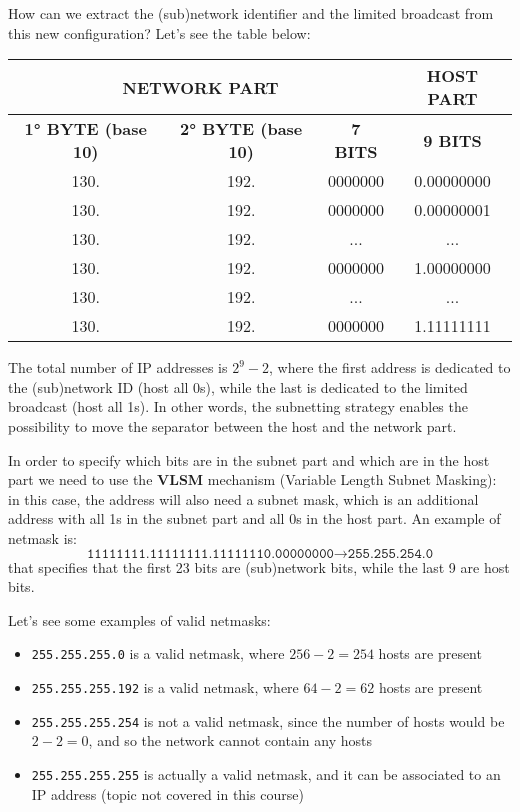 How can we extract the (sub)network identifier and the limited broadcast from this new configuration? Let's see the table below:
\begin{table}[!h]
    \centering
    \begin{tabular}{|ccc|c|}
    \hline
    \multicolumn{3}{|c|}{\textbf{NETWORK PART}} & \textbf{HOST PART} \\ \hline
    \multicolumn{1}{|c|}{\textbf{1° BYTE (base 10)}} & \multicolumn{1}{c|}{\textbf{2° BYTE (base 10)}} & \textbf{7 BITS} & \textbf{9 BITS} \\ \hline
    \multicolumn{1}{|c|}{130.} & \multicolumn{1}{c|}{192.} & 0000000 & 0.00000000 \\ \hline
    \multicolumn{1}{|c|}{130.} & \multicolumn{1}{c|}{192.} & 0000000 & 0.00000001 \\ \hline
    \multicolumn{1}{|c|}{130.} & \multicolumn{1}{c|}{192.} & ... & ... \\ \hline
    \multicolumn{1}{|c|}{130.} & \multicolumn{1}{c|}{192.} & 0000000 & 1.00000000 \\ \hline
    \multicolumn{1}{|c|}{130.} & \multicolumn{1}{c|}{192.} & ... & ... \\ \hline
    \multicolumn{1}{|c|}{130.} & \multicolumn{1}{c|}{192.} & 0000000 & 1.11111111 \\ \hline
    \end{tabular}
\end{table} 
\noindent The total number of IP addresses is \(2^9-2\), where the first address is dedicated to the (sub)network ID (host all 0s), while the last is dedicated to the limited broadcast (host all 1s). In other words, the subnetting strategy enables the possibility to move the separator between the host and the network part.

In order to specify which bits are in the subnet part and which are in the host part we need to use the \textbf{VLSM} mechanism (Variable Length Subnet Masking): in this case, the address will also need a subnet mask, which is an additional address with all 1s in the subnet part and all 0s in the host part. An example of netmask is:
\[\texttt{11111111.11111111.11111110.00000000}\rightarrow \texttt{255.255.254.0}\]
that specifies that the first 23 bits are (sub)network bits, while the last 9 are host bits.

Let's see some examples of valid netmasks:
\begin{itemize}
    \item \texttt{255.255.255.0} is a valid netmask, where \(256-2=254\) hosts are present
    \item \texttt{255.255.255.192} is a valid netmask, where \(64-2=62\) hosts are present
    \item \texttt{255.255.255.254} is not a valid netmask, since the number of hosts would be \(2-2=0\), and so the network cannot contain any hosts
    \item \texttt{255.255.255.255} is actually a valid netmask, and it can be associated to an IP address (topic not covered in this course)
\end{itemize}

